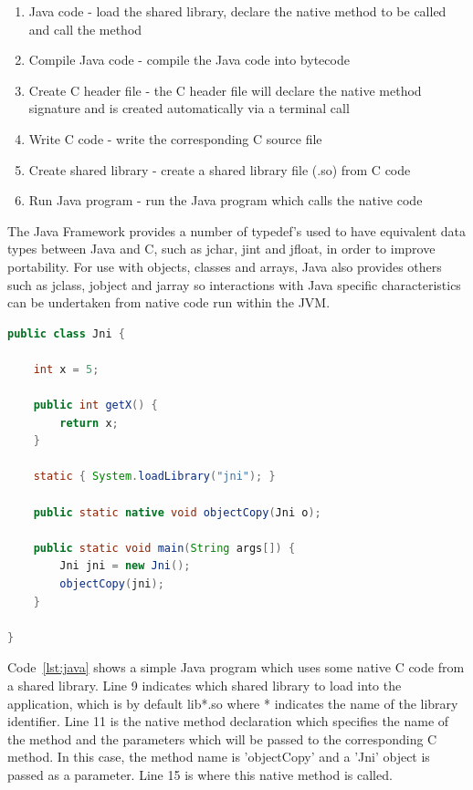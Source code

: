 \documentclass[final_report.tex]{subfiles}
\begin{document}
\begin{enumerate}
	\item Java code - load the shared library, declare the native method to be called and call the method
	\item Compile Java code - compile the Java code into bytecode
	\item Create C header file - the C header file will declare the native method signature and is created automatically via a terminal call
	\item Write C code - write the corresponding C source file
	\item Create shared library - create a shared library file (.so) from C code
	\item Run Java program - run the Java program which calls the native code
\end{enumerate}

The Java Framework provides a number of typedef's used to have equivalent data types between Java and C, such as jchar, jint and jfloat, in order to improve portability. For use with objects, classes and arrays, Java also provides others such as jclass, jobject and jarray so interactions with Java specific characteristics can be undertaken from native code run within the JVM.

\begin{lstlisting}[language=Java, caption={Basic Java class showing native method declaration and calling with shared library loading}, label=lst:java]
public class Jni {

	int x = 5;

	public int getX() {
		return x;
	}

	static { System.loadLibrary("jni"); }

	public static native void objectCopy(Jni o);

	public static void main(String args[]) {
		Jni jni = new Jni();
		objectCopy(jni);
	}

}
\end{lstlisting}

Code~\ref{lst:java} shows a simple Java program which uses some native C code from a shared library. Line 9 indicates which shared library to load into the application, which is by default lib*.so where * indicates the name of the library identifier. Line 11 is the native method declaration which specifies the name of the method and the parameters which will be passed to the corresponding C method. In this case, the method name is 'objectCopy' and a 'Jni' object is passed as a parameter. Line 15 is where this native method is called.
\end{document}
